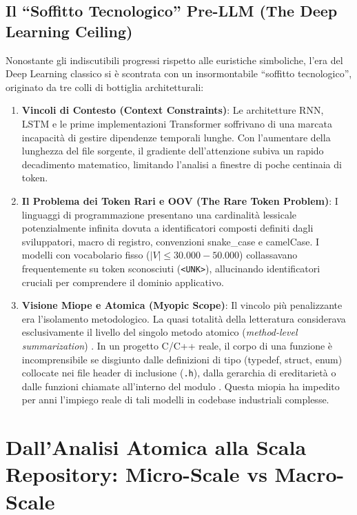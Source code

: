 \subsection{Il ``Soffitto Tecnologico'' Pre-LLM (The Deep Learning Ceiling)}
\label{subsec:soffitto_tecnologico}
Nonostante gli indiscutibili progressi rispetto alle euristiche simboliche, l'era del Deep Learning classico si è scontrata con un insormontabile ``soffitto tecnologico'', originato da tre colli di bottiglia architetturali:
\begin{enumerate}
    \item \textbf{Vincoli di Contesto (Context Constraints)}: Le architetture RNN, LSTM e le prime implementazioni Transformer soffrivano di una marcata incapacità di gestire dipendenze temporali lunghe. Con l'aumentare della lunghezza del file sorgente, il gradiente dell'attenzione subiva un rapido decadimento matematico, limitando l'analisi a finestre di poche centinaia di token.
    \item \textbf{Il Problema dei Token Rari e OOV (The Rare Token Problem)}: I linguaggi di programmazione presentano una cardinalità lessicale potenzialmente infinita dovuta a identificatori composti definiti dagli sviluppatori, macro di registro, convenzioni snake\_case e camelCase. I modelli con vocabolario fisso ($|V| \le 30.000-50.000$) collassavano frequentemente su token sconosciuti (\texttt{<UNK>}), allucinando identificatori cruciali per comprendere il dominio applicativo.
    \item \textbf{Visione Miope e Atomica (Myopic Scope)}: Il vincolo più penalizzante era l'isolamento metodologico. La quasi totalità della letteratura considerava esclusivamente il livello del singolo metodo atomico (\emph{method-level summarization}) \cite{rai_review_2022}. In un progetto C/C++ reale, il corpo di una funzione è incomprensibile se disgiunto dalle definizioni di tipo (typedef, struct, enum) collocate nei file header di inclusione (\texttt{.h}), dalla gerarchia di ereditarietà o dalle funzioni chiamate all'interno del modulo \cite{bansal_project-level_2021,lomshakov_proconsul_2024}. Questa miopia ha impedito per anni l'impiego reale di tali modelli in codebase industriali complesse.
\end{enumerate}

\section{Dall'Analisi Atomica alla Scala Repository: Micro-Scale vs Macro-Scale}
\label{sec:intro_micro_macro}

